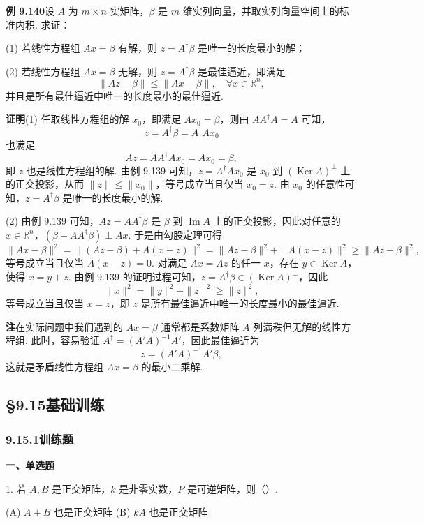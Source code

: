 \documentclass[UTF8,12pt,a4paper,fontset=fandol]{ctexart}
\begin{document}
\noindent\textbf{例 9.140}\quad 设 $A$ 为 $m\times n$ 实矩阵，$\beta$ 是 $m$ 维实列向量，并取实列向量空间上的标准内积. 求证：

(1) 若线性方程组 $Ax=\beta$ 有解，则 $z=A^\dagger\beta$ 是唯一的长度最小的解；

(2) 若线性方程组 $Ax=\beta$ 无解，则 $z=A^\dagger\beta$ 是最佳逼近，即满足
\[
\|Az-\beta\|\le\|Ax-\beta\|,\quad \forall x\in\mathbb{R}^n,
\]
并且是所有最佳逼近中唯一的长度最小的最佳逼近.

\noindent\textbf{证明}\quad (1) 任取线性方程组的解 $x_0$，即满足 $Ax_0=\beta$，则由 $AA^\dagger A=A$ 可知，
\[
z=A^\dagger\beta=A^\dagger Ax_0
\]
也满足
\[
Az=AA^\dagger Ax_0=Ax_0=\beta,
\]
即 $z$ 也是线性方程组的解. 由例 9.139 可知，$z=A^\dagger Ax_0$ 是 $x_0$ 到 $(\operatorname{Ker}A)^\perp$ 上的正交投影，从而 $\|z\|\le\|x_0\|$，等号成立当且仅当 $x_0=z$. 由 $x_0$ 的任意性可知，$z=A^\dagger\beta$ 是唯一的长度最小的解.

(2) 由例 9.139 可知，$Az=AA^\dagger\beta$ 是 $\beta$ 到 $\operatorname{Im}A$ 上的正交投影，因此对任意的 $x\in\mathbb{R}^n$，$(\beta-AA^\dagger\beta)\perp Ax$. 于是由勾股定理可得
\[
\|Ax-\beta\|^2=\|(Az-\beta)+A(x-z)\|^2=\|Az-\beta\|^2+\|A(x-z)\|^2\ge\|Az-\beta\|^2,
\]
等号成立当且仅当 $A(x-z)=0$. 对满足 $Ax=Az$ 的任一 $x$，存在 $y\in\operatorname{Ker}A$，使得 $x=y+z$. 由例 9.139 的证明过程可知，$z=A^\dagger\beta\in(\operatorname{Ker}A)^\perp$，因此
\[
\|x\|^2=\|y\|^2+\|z\|^2\ge\|z\|^2,
\]
等号成立当且仅当 $x=z$，即 $z$ 是所有最佳逼近中唯一的长度最小的最佳逼近.

\noindent\textbf{注}\quad 在实际问题中我们遇到的 $Ax=\beta$ 通常都是系数矩阵 $A$ 列满秩但无解的线性方程组. 此时，容易验证 $A^\dagger=(A'A)^{-1}A'$，因此最佳逼近为
\[
z=(A'A)^{-1}A'\beta,
\]
这就是矛盾线性方程组 $Ax=\beta$ 的最小二乘解.

\subsection*{§9.15\quad 基础训练}

\subsubsection*{9.15.1\quad 训练题}

\noindent\textbf{一、单选题}

1. 若 $A,B$ 是正交矩阵，$k$ 是非零实数，$P$ 是可逆矩阵，则（\quad ）.

(A) $A+B$ 也是正交矩阵 \qquad (B) $kA$ 也是正交矩阵
\end{document}
